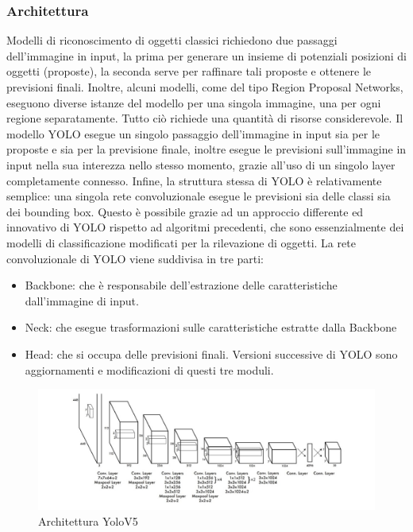 \documentclass{article}
\begin{document}
    \subsubsection{Architettura}
    \cite{yolotutorial}  \cite{yoloarch}
    Modelli di riconoscimento di oggetti classici richiedono due passaggi dell'immagine in input, la prima per generare un insieme di potenziali posizioni di oggetti (proposte), la seconda serve per raffinare tali proposte e ottenere le previsioni finali.
    Inoltre, alcuni modelli, come del tipo Region Proposal Networks, eseguono diverse istanze del modello per una singola immagine, una per ogni regione separatamente. Tutto ciò richiede una quantità di risorse considerevole.
    Il modello YOLO esegue un singolo passaggio dell'immagine in input sia per le proposte e sia per la previsione finale, inoltre esegue le previsioni sull'immagine in input nella sua interezza nello stesso momento, grazie all'uso di un singolo layer completamente connesso. 
    Infine, la struttura stessa di YOLO è relativamente semplice: una singola rete convoluzionale esegue le previsioni sia delle classi sia dei bounding box. Questo è possibile grazie ad un approccio differente ed innovativo di YOLO rispetto ad algoritmi precedenti, che sono essenzialmente dei modelli di classificazione modificati per la rilevazione di oggetti.
    La rete convoluzionale di YOLO viene suddivisa in tre parti: 
    \begin{itemize}
        \item Backbone: che è responsabile dell'estrazione delle caratteristiche dall'immagine di input.
        \item Neck: che esegue trasformazioni sulle caratteristiche estratte dalla Backbone
        \item Head: che si occupa delle previsioni finali.
    Versioni successive di YOLO sono aggiornamenti e modificazioni di questi tre moduli.
    \end{itemize}
    
\begin{figure}[h!]
    \centering
    \includegraphics[width=1.1\linewidth]{architetttura_yolo.jpg}
    \caption{Architettura YoloV5}
\end{figure}
\end{document}
